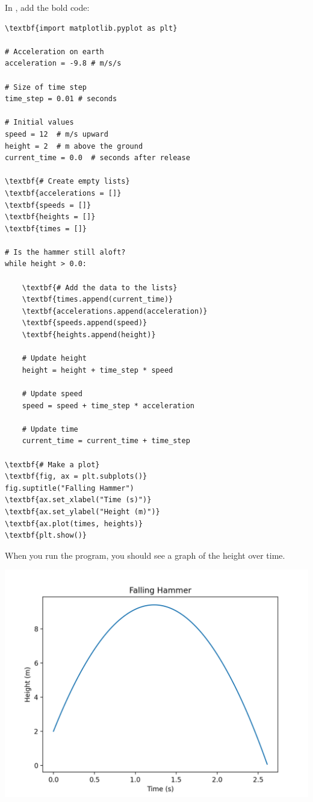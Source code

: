 In , add the bold code:

\begin{Verbatim}[commandchars=\\\{\}]
\textbf{import matplotlib.pyplot as plt}

# Acceleration on earth
acceleration = -9.8 # m/s/s

# Size of time step
time_step = 0.01 # seconds

# Initial values
speed = 12  # m/s upward
height = 2  # m above the ground
current_time = 0.0  # seconds after release

\textbf{# Create empty lists}
\textbf{accelerations = []}
\textbf{speeds = []}
\textbf{heights = []}
\textbf{times = []}

# Is the hammer still aloft?
while height > 0.0:

    \textbf{# Add the data to the lists}
    \textbf{times.append(current_time)}
    \textbf{accelerations.append(acceleration)}
    \textbf{speeds.append(speed)}
    \textbf{heights.append(height)}
    
    # Update height
    height = height + time_step * speed

    # Update speed
    speed = speed + time_step * acceleration

    # Update time
    current_time = current_time + time_step

\textbf{# Make a plot}
\textbf{fig, ax = plt.subplots()}
fig.suptitle("Falling Hammer")
\textbf{ax.set_xlabel("Time (s)")}
\textbf{ax.set_ylabel("Height (m)")}
\textbf{ax.plot(times, heights)}
\textbf{plt.show()}
\end{Verbatim}

When you run the program, you should see a graph of the height over time.

\includegraphics[width=0.7\linewidth]{heightplot.png}

